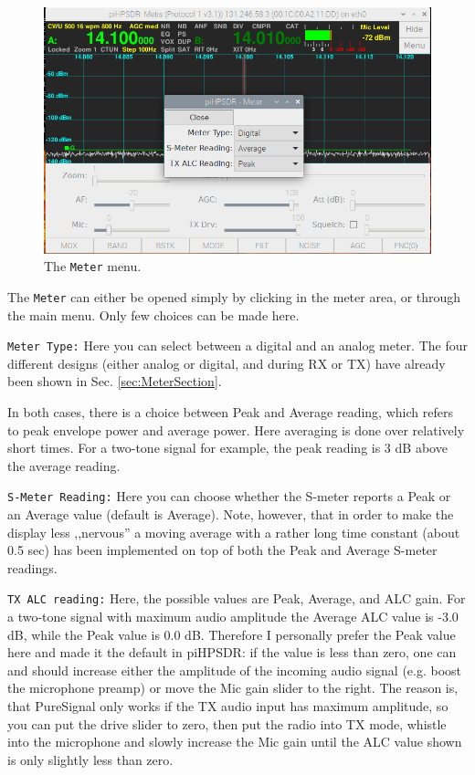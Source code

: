 \documentclass[12pt]{book}
\def\rett#1{\texttt{\color{red}#1}}
\def\bltt#1{\texttt{\color{blue}#1}}
\begin{document}
\begin{figure}[ht]
\center
\includegraphics[width=12cm]{MeterMenu.png}
\caption{The \bltt{Meter} menu.}
\label{fig:Meter}
\end{figure}

The \bltt{Meter} can either be opened simply by clicking in the meter
area, or through the main menu. Only few choices can be made here.

\rett{Meter Type:} Here you can select between a digital and an analog
meter. The four different designs (either analog or digital, and during
RX or TX) have already been shown in Sec. \ref{sec:MeterSection}.

In both cases, there is a choice between Peak and Average reading, which
refers to peak envelope power and average power. Here averaging is done
over relatively short times. For a two-tone signal for example, the peak
reading is 3 dB above the average reading.

\rett{S-Meter Reading:} Here you can choose whether the S-meter reports
a Peak or an Average value (default is Average).
Note, however, that in order to make the
display less ,,nervous'' a moving average with a rather long time constant
(about 0.5 sec) has been implemented on top of both the Peak and Average
S-meter readings.


\rett{TX ALC reading:} Here, the possible values are Peak, Average, and
ALC gain. For a two-tone signal with maximum audio amplitude the Average
ALC value is -3.0 dB, while the Peak value is 0.0 dB. Therefore I personally
prefer the Peak value here and made it the default in piHPSDR:
 if the value is less than zero, one can and should
increase either the amplitude of the incoming audio signal (e.g. boost the
microphone preamp) or move the Mic gain slider to the right. The reason is,
that PureSignal only works if the TX audio input has maximum amplitude,
so you can put the drive slider to zero, then put the radio into TX mode,
whistle into the microphone and slowly increase the Mic gain until the
ALC value shown is only slightly less than zero.
\end{document}
